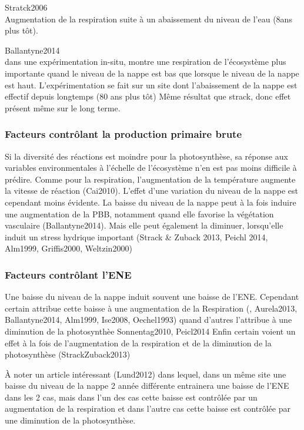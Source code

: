 Stratck2006 \\
Augmentation de la respiration suite à un abaissement du niveau de l'eau (8ans plus tôt).

Ballantyne2014 \\
dans une expérimentation in-situ, montre une respiration de l'écosystème plus importante quand le niveau de la nappe est bas que lorsque le niveau de la nappe est haut.
L'expérimentation se fait sur un site dont l'abaissement de la nappe est effectif depuis longtemps (80 ans plus tôt)
Même résultat que strack, donc effet présent même sur le long terme.

\subsubsection{Facteurs contrôlant la production primaire brute}
Si la diversité des réactions est moindre pour la photosynthèse, sa réponse aux variables environmentales à l'échelle de l'écosystème n'en est pas moins difficile à prédire.
Comme pour la respiration, l'augmentation de la température augmente la vitesse de réaction (Cai2010).
\plop
L'effet d'une variation du niveau de la nappe est cependant moins évidente.
La baisse du niveau de la nappe peut à la fois induire une augmentation de la PBB, notamment quand elle favorise la végétation vasculaire (Ballantyne2014).
Mais elle peut également la diminuer, lorsqu'elle induit un stress hydrique important (Strack \& Zuback 2013, Peichl 2014, Alm1999, Griffis2000, Weltzin2000)

\subsubsection{Facteurs contrôlant l'ENE}
Une baisse du niveau de la nappe induit souvent une baisse de l'ENE.
Cependant certain attribue cette baisse à une augmentation de la Respiration (, Aurela2013, Ballantyne2014, Alm1999, Ise2008, Oechel1993) quand d'autres l'attribue à une diminution de la photosynthèe Sonnentag2010, Peicl2014 
Enfin certain voient un effet à la fois de l'augmentation de la respiration et de la diminution de la photosynthèse (StrackZuback2013)

À noter un article intéressant (Lund2012) dans lequel, dans un même site une baisse du niveau de la nappe 2 année différente entrainera une baisse de l'ENE dans les 2 cas, mais dans l'un des cas cette baisse est contrôlée par un augmentation de la respiration et dans l'autre cas cette baisse est contrôlée par une diminution de la photosynthèse.

